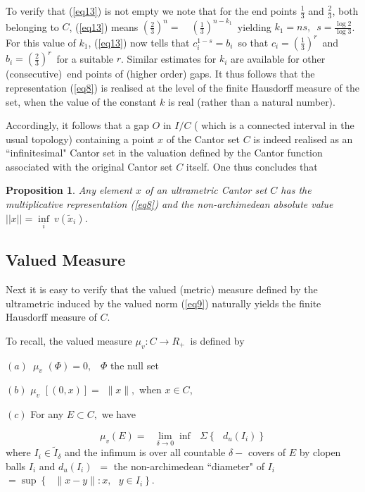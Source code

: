 \documentclass[12pt]{article}
\newtheorem{proposition}[theorem]{Proposition}
\begin{document}
To verify that (\ref{eq13}) is not empty we note that for the end points $\frac{1}{3}
$ and $\frac{2}{3}$, both belonging to $C$, (\ref{eq13}) means $\left( \frac{2}{3}%
\right) ^{n}=$\ \ $\left( \frac{1}{3}\right) ^{n-k_1}$\ yielding $k_1=ns,$\ $s=%
\frac{\log 2}{\log 3}$. For this value of $k_1$, (\ref{eq13}) now tells that $%
c_{i}^{1-s}=b_{i}$\ so that $c_{i}=({\frac{1}{3}})^{r}$\ and $b_{i}=\left( 
\frac{2}{3}\right) ^{r}$\ for a suitable $r$. Similar estimates for $k_i$
are available for other (consecutive)\ end points of (higher order) gaps.
It thus follows that the representation (\ref{eq8}) is realised  at the level of the finite Hausdorff measure of the set, when the value of the constant $k$ is real (rather than a natural number).
\vspace{.25cm}

Accordingly, it follows that a gap $O$ in $I/C$ ( which is a connected interval 
in the usual topology) containing a point $x$ of the Cantor set $C$ is indeed 
realised as an ``infinitesimal"  Cantor set in the valuation defined by the Cantor function associated with the original Cantor set $C$ itself. One thus concludes that 

\begin{proposition}
Any element $x$ of an ultrametric Cantor set $C$ has the multiplicative representation (\ref{eq8}) and the non-archimedean absolute value $||x||=\underset{i}{\inf} \  v(\tilde x_i)$. 
\end{proposition}
 
\subsection{Valued Measure}

Next it is easy to verify that the valued (metric) measure defined by the
ultrametric induced by the valued norm (\ref{eq9}) naturally yields the finite
Hausdorff measure of $C$.

\vspace{.25cm}

To recall, the valued measure $\mu _{v}:C\rightarrow R_{+}$\ is defined by

$(a)$\ $\mu _{v}$ $(\Phi )=0,$ \ $\Phi $ the null set

$(b)$ $\mu _{v}$ $[(0,x)]=$ $\parallel x\parallel ,$ when $x\in C$, 

$(c)$ For any $E\subset C,$ we have

\begin{equation}\label{eq14}
\mu _{v}(E)=\text{ }\underset{\delta \rightarrow 0}{\lim }\inf \text{ }%
\Sigma \left\{ \text{ }d_{u}(I_{i})\right\}
\end{equation}
\noindent where $I_{i}\in \tilde I_{\delta}$ and the infimum is over
all countable $\delta -$ covers of $E$ by clopen balls $I_i$ and 
$d_{u}(I_{i})$\ $=$ the non-archimedean ``diameter" of $I_{i}$ $=\sup \left\{ 
\text{ }\parallel x-y\parallel :x,\text{ }y\in I_{i}\right\}.$ 
\end{document}
